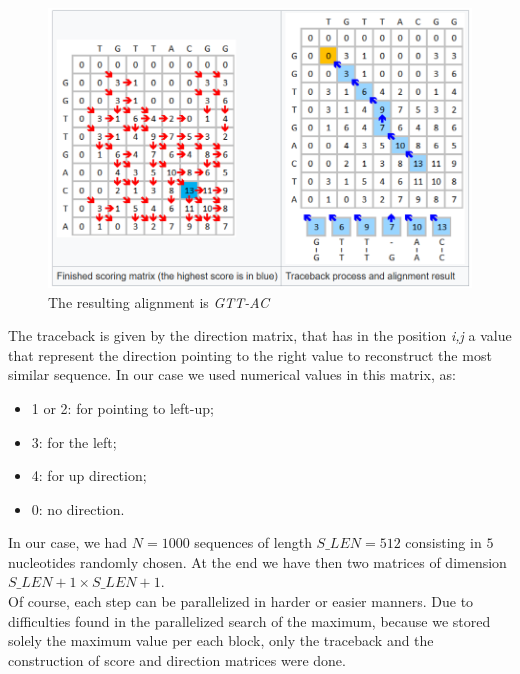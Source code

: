 \documentclass[conference]{IEEEtran}
\begin{document}
	\begin{figure}[htbp]
		\centering
		\includegraphics[width=\linewidth]{Immagine 2025-01-27 203520.png}
		\caption{The resulting alignment is \textit{GTT-AC}}
		\label{fig:boh}
	\end{figure}
	The traceback is given by the direction matrix, that has in the position \textit{i,j} a value that represent the direction pointing to the right value to reconstruct the most similar sequence. In our case we used numerical values in this matrix, as:
	\begin{itemize}
		\item 1 or 2: for pointing to left-up;
		
		\item 3: for the left;
		
		\item 4: for up direction;
		
		\item 0: no direction.
	\end{itemize}
	In our case, we had $N=1000$ sequences of length $S\_LEN=512$ consisting in $5$ nucleotides randomly chosen. At the end we have then two matrices of dimension $S\_LEN+1\times S\_LEN+1$.\\
	Of course, each step can be parallelized in harder or easier manners. Due to difficulties found in the parallelized search of the maximum, because we stored solely the maximum value per each block, only the traceback and the construction of score and direction matrices were done.
	
\end{document}
